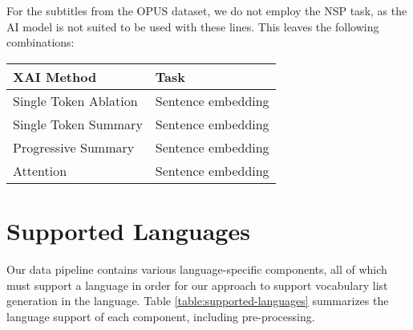 For the subtitles from the OPUS dataset, we do not employ the NSP task, as the AI model is not suited to be used with these lines.
This leaves the following combinations:

\begin{table}[H]
	\centering
	\begin{tabularx}{\textwidth}{|X|X|}
		\hline
		\textbf{XAI Method}   & \textbf{Task}      \\
		\hline
		Single Token Ablation & Sentence embedding \\
		\hline
		Single Token Summary  & Sentence embedding \\
		\hline
		Progressive Summary   & Sentence embedding \\
		\hline
		Attention             & Sentence embedding \\
		\hline
	\end{tabularx}
\end{table}



% 	

\section{Supported Languages}
Our data pipeline contains various language-specific components, all of which must support a language in order for our approach to support vocabulary list generation in the language.
Table \ref{table:supported-languages} summarizes the language support of each component, including pre-processing.

